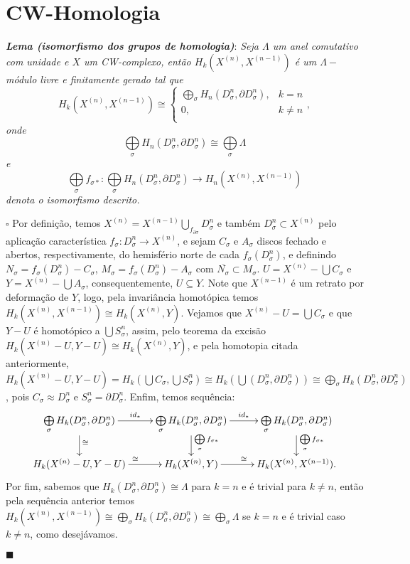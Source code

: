 \documentclass[12pt]{book}
\newcommand{\celula}[2]{D^{#1}_{#2}}
\newcommand{\celulabordo}[2]{\partial D^{#1}_{#2}}
\newcommand{\skeleton}[1]{X^{(#1)}}
\newcommand{\homologia}[2]{H_{#1}(#2)}
\newcommand{\homologiarel}[3]{H_{#1}(#2,#3)}
\newcommand{\homologiarelcel}[3]{H_{#1}(D^{#2}_{#3}, \partial D^{#2}_{#3})}
\newcommand{\homologiarelskelesimpl}[2]{H_{#1}(X^{(#2)}, X^{(#2-1)})}
\newcommand{\somadir}[1]{\bigoplus \limits_{#1}}
\newcommand{\tese}[3]{\vspace{2mm} \textit{\textbf{#1}}: \textit{#2} \par $\square$ #3 \par $\blacksquare$}
\begin{document}
	\section{CW-Homologia}
	\tese{Lema (isomorfismo dos grupos de homologia)}{Seja $\Lambda$ um anel comutativo com unidade e $X$ um CW-complexo, então $\homologiarelskelesimpl{k}{n} $ é um $\Lambda-$módulo livre e finitamente gerado tal que
	$$
	\homologiarelskelesimpl{k}{n} \cong 
	\left\{
		\begin{array}{cc}
		\somadir{\sigma} \homologiarelcel{n}{n}{\sigma} , & k = n\\
		0, & k\neq n\\
		\end{array}
	\right.,
	$$
	onde 
	$$
	\somadir{\sigma} \homologiarelcel{n}{n}{\sigma} \cong \somadir{\sigma} \Lambda
	$$
	e
	$$
	\somadir{\sigma}f_{\sigma*}: \somadir{\sigma} \homologiarelcel{n}{n}{\sigma} \to \homologiarelskelesimpl{n}{n}
	$$
	denota o isomorfismo descrito.}{Por definição, temos  $\skeleton{n} = \skeleton{n-1} \bigcup_{f_{\partial \sigma} } \celula{n}{\sigma}$ e também $\celula{n}{\sigma} \subset \skeleton{n}$ pelo aplicação característica $f_{\sigma} : \celula{n}{\sigma} \to \skeleton{n}$, e sejam $C_{\sigma}$ e $A_{\sigma}$ discos fechado e abertos, respectivamente, do hemisfério norte de cada $f_{\sigma}(\celula{n}{\sigma})$, e definindo $N_{\sigma} = f_{\sigma}(\celula{n}{\sigma}) - C_{\sigma}$, $M_{\sigma} = f_{\sigma}(\celula{n}{\sigma}) - A_{\sigma}$ com $\overline{N_{\sigma}} \subset M_{\sigma}$. $U = \skeleton{n} - \bigcup C_{\sigma}$ e $Y = \skeleton{n} - \bigcup A_{\sigma}$, consequentemente, $U \subseteq Y$. Note que $\skeleton{n-1}$ é um retrato por deformação de $Y$, logo, pela invariância homotópica temos $\homologiarel{k}{\skeleton{n}}{\skeleton{n-1}} \cong  \homologiarel{k}{\skeleton{n}}{Y}$. Vejamos que $\skeleton{n} - U = \bigcup C_{\sigma}$ e que $Y - U $ é homotópico a $\bigcup S^{n}_{\sigma}$, assim, pelo teorema da excisão $\homologiarel{k}{\skeleton{n} - U}{Y- U} \cong \homologiarel{k}{\skeleton{n}}{Y}$, e pela homotopia citada anteriormente, $\homologiarel{k}{\skeleton{n} - U}{Y- U} = \homologiarel{k}{\bigcup C_{\sigma}}{\bigcup S^{n}_{\sigma}} \cong \homologia{k}{\bigcup (\celula{n}{\sigma}, \celulabordo{n}{\sigma})} \cong \somadir{\sigma} \homologiarelcel{k}{n}{\sigma}$, pois $C_{\sigma} \approx \celula{n}{\sigma}$ e $S^{n}_{\sigma} = \celulabordo{n}{\sigma}$. Enfim, temos sequência:
	\[
	\xymatrix{
		\somadir{\sigma} \homologiarelcel{k}{n}{\sigma} \ar[r]^{id_{*}} \ar[d]^{\cong} & 
		\somadir{\sigma} \homologiarelcel{k}{n}{\sigma} \ar[r]^{id_{*}} \ar[d]^{\somadir{\sigma}f_{\sigma*}} & 
		\somadir{\sigma} \homologiarelcel{k}{n}{\sigma} \ar[d]^{\somadir{\sigma}f_{\sigma*}} 
		\\
		\homologiarel{k}{\skeleton{n} - U}{Y- U} \ar[r]^{\cong} & \homologiarel{k}{\skeleton{n}}{Y} \ar[r]^{\cong} & 
		\homologiarelskelesimpl{k}{n}.
	}
	\]
	Por fim, sabemos que $\homologiarelcel{k}{n}{\sigma} \cong \Lambda$ para $k=n$ e é trivial para $k\neq n$, então pela sequência anterior temos $\homologiarelskelesimpl{k}{n} \cong \somadir{\sigma}\homologiarelcel{k}{n}{\sigma} \cong \somadir{\sigma} \Lambda$ se $k=n$ e é trivial caso $k\neq n$, como desejávamos.}
\end{document}
